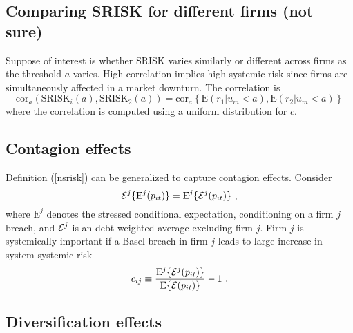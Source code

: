 \documentclass[authoryear]{elsarticle}
\newcommand{\E}{\mathrm{E}}
\newcommand{\e}{\mathrm{e}}
\newcommand{\Ex}{{\cal E}}
\newcommand{\cor}{\mathrm{cor}}
\newcommand{\eref}[1]{(\ref{#1})}
\newcommand{\be}[1]{\begin{equation}\label{#1}}
\newcommand{\ee}{\end{equation}}
\begin{document}
\subsection{Comparing SRISK for different firms (not sure)}

Suppose of interest is whether SRISK varies similarly or different across firms as the threshold $a$ varies. High correlation implies high systemic risk since firms are simultaneously affected in a market downturn. The correlation is
$$
\cor_a\left( \mathrm{SRISK}_i(a), \mathrm{SRISK}_2(a)\right) = \cor_a \left\{\E(r_1|u_m < a),\E(r_2|u_m < a)   \right\}
$$
where the correlation is computed using a uniform distribution for $c$. 


\begin{comment}
\subsection{Weihao - Allocating the market put}

The overall market shortfall after allowing for diversification between firms is
$$
p_{mt}\equiv k_+ |1-\e^{-\ell^*_{mt}+\nu_{mt}}|^+
= k_+|\Ex (1-\e^{-\ell^*_{it}+\nu_{it}})|^+
=I(\nu_{mt}<\ell_{mt}^*)k_+\Ex(1-\e^{-\ell^*_{it}+\nu_{it}}) 
$$
and hence the portion attributable to firm $i$ is $k_i(1-\e^{-\ell^*_{it}+\nu_{it}}) I(\nu_{mt}<\ell_{mt}^*)$, its capital shortfall or surplus when the overall market is in a shortfall. The allocation of the stressed expectation $\E(p_{mt})$ is then
$$
k_i\E\{(1-\e^{-\ell^*_{it}+\nu_{it}}) I(\nu_{mt}<\ell_{mt}^*)\}
$$
and applying $\Ex$ to the above expression yields $\E(p_{mt})$.
\end{comment}





\subsection{Contagion effects}
Definition \eref{nsrisk} can be generalized to capture contagion effects.  Consider 
\be{cont}
\Ex^j\{\E^j(p_{it})\}=\E^j\{\Ex^j(p_{it})\}\ ,
\ee
where  $\E^j$ denotes the stressed conditional expectation, conditioning on a firm $j$ breach, and $\Ex^j$ is an debt weighted average excluding firm $j$.  Firm $j$ is systemically important  if a Basel breach in firm $j$ leads to large increase in system systemic risk
$$
c_{ij}\equiv \frac{\E^j\{\Ex^j(p_{it})\}}{\E\{\Ex(p_{it})\}}-1\ .
$$

\subsection{Diversification effects} 
\end{document}

